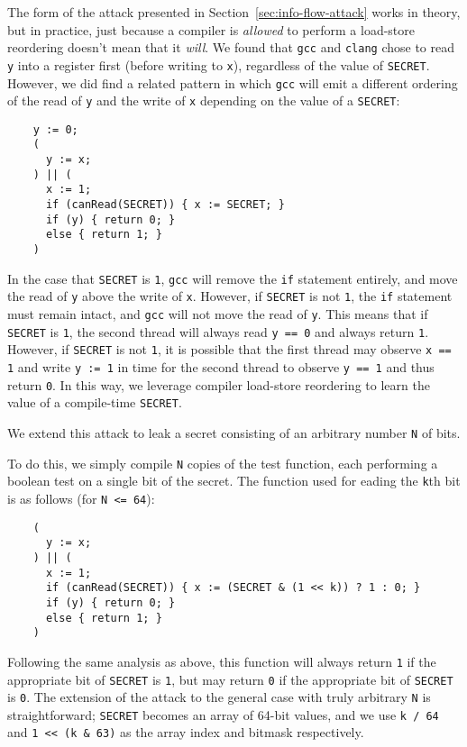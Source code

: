 The form of the attack presented in Section~\ref{sec:info-flow-attack} works in
theory, but in practice, just because a compiler is \emph{allowed} to perform a
load-store reordering doesn't mean that it \emph{will}.
We found that \verb|gcc| and \verb|clang| chose to read \verb|y| into a
register first (before writing to \verb|x|), regardless of the value of
\verb|SECRET|.
However, we did find a related pattern in which \verb|gcc| will emit a
different ordering of the read of \verb|y| and the write of \verb|x| depending
on the value of a \verb|SECRET|:
\begin{verbatim}
    y := 0;
    (
      y := x;
    ) || (
      x := 1;
      if (canRead(SECRET)) { x := SECRET; }
      if (y) { return 0; }
      else { return 1; }
    )
\end{verbatim}
In the case that \verb|SECRET| is \verb|1|, \verb|gcc| will remove the
\verb|if| statement entirely, and move the read of \verb|y| above the write of
\verb|x|.
However, if \verb|SECRET| is not \verb|1|, the \verb|if| statement must remain
intact, and \verb|gcc| will not move the read of \verb|y|.
This means that if \verb|SECRET| is \verb|1|, the second thread will always
read \verb|y == 0| and always return \verb|1|.
However, if \verb|SECRET| is not \verb|1|, it is possible that the first thread
may observe \verb|x == 1| and write \verb|y := 1| in time for the second thread
to observe \verb|y == 1| and thus return \verb|0|.
In this way, we leverage compiler load-store reordering to learn the value of
a compile-time \verb|SECRET|.

We extend this attack to leak a secret consisting of an arbitrary number
\verb|N| of bits.

To do this, we simply compile \verb|N| copies of the test function, each
performing a boolean test on a single bit of the secret.
The function used for eading the \verb|k|th bit is as follows (for
\verb|N <= 64|):
\begin{verbatim}
    (
      y := x;
    ) || (
      x := 1;
      if (canRead(SECRET)) { x := (SECRET & (1 << k)) ? 1 : 0; }
      if (y) { return 0; }
      else { return 1; }
    )
\end{verbatim}
Following the same analysis as above, this function will always return \verb|1|
if the appropriate bit of \verb|SECRET| is \verb|1|, but may return \verb|0| if
the appropriate bit of \verb|SECRET| is \verb|0|.
The extension of the attack to the general case with truly arbitrary \verb|N|
is straightforward; \verb|SECRET| becomes an array of 64-bit values, and we use
\verb|k / 64| and \verb|1 << (k & 63)| as the array index and bitmask
respectively.

